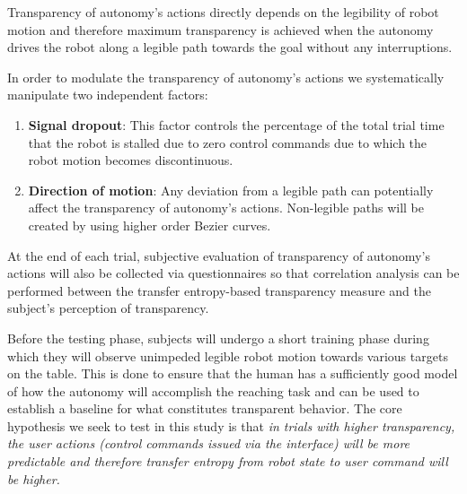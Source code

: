 \documentclass[12pt]{article}
\begin{document}
Transparency of autonomy's actions directly depends on the legibility of robot motion and therefore maximum transparency is achieved when the autonomy drives the robot along a legible path towards the goal without any interruptions. 

In order to modulate the transparency of autonomy's actions we systematically manipulate two independent factors:
\begin{enumerate}
	\item \textbf{Signal dropout}: This factor controls the percentage of the total trial time that the robot is stalled due to zero control commands due to which the robot motion becomes discontinuous. 
	\item \textbf{Direction of motion}: Any deviation from a legible path can potentially affect the transparency of autonomy's actions. Non-legible paths will be created by using higher order Bezier curves. 
\end{enumerate}


At the end of each trial, subjective evaluation of transparency of autonomy's actions will also be collected via questionnaires so that correlation analysis can be performed between the transfer entropy-based transparency measure and the subject's perception of transparency. 

Before the testing phase, subjects will undergo a short training phase during which they will observe unimpeded legible robot motion towards various targets on the table. This is done to ensure that the human has a sufficiently good model of how the autonomy will accomplish the reaching task and can be used to establish a baseline for what constitutes transparent behavior. 
The core hypothesis we seek to test in this study is that \textit{in trials with higher transparency, the user actions (control commands issued via the interface) will be more predictable and therefore transfer entropy from robot state to user command will be higher. }
\end{document}
